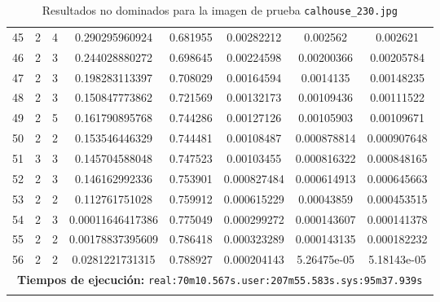 \begin{longtable}{|c|c|c|c|c|c|c|c|}
45 & 2 & 4 & 0.290295960924 & 0.681955 & 0.00282212 & 0.002562 & 0.002621 \\
46 & 2 & 3 & 0.244028880272 & 0.698645 & 0.00224598 & 0.00200366 & 0.00205784 \\
47 & 2 & 3 & 0.198283113397 & 0.708029 & 0.00164594 & 0.0014135 & 0.00148235 \\
48 & 2 & 3 & 0.150847773862 & 0.721569 & 0.00132173 & 0.00109436 & 0.00111522 \\
49 & 2 & 5 & 0.161790895768 & 0.744286 & 0.00127126 & 0.00105903 & 0.00109671 \\
50 & 2 & 2 & 0.153546446329 & 0.744481 & 0.00108487 & 0.000878814 & 0.000907648 \\
51 & 3 & 3 & 0.145704588048 & 0.747523 & 0.00103455 & 0.000816322 & 0.000848165 \\
52 & 2 & 3 & 0.146162992336 & 0.753901 & 0.000827484 & 0.000614913 & 0.000645663 \\
53 & 2 & 2 & 0.112761751028 & 0.759912 & 0.000615229 & 0.00043859 & 0.000453515 \\
54 & 2 & 3 & 0.00011646417386 & 0.775049 & 0.000299272 & 0.000143607 & 0.000141378 \\
55 & 2 & 2 & 0.00178837395609 & 0.786418 & 0.000323289 & 0.000143135 & 0.000182232 \\
56 & 2 & 2 & 0.0281221731315 & 0.788927 & 0.000204143 & 5.26475e-05 & 5.18143e-05 \\
\hline
\multicolumn{8}{|c|}{\textbf{Tiempos de ejecución:} \texttt{real:70m10.567s.user:207m55.583s.sys:95m37.939s}}\\  \hline
\caption{Resultados no dominados para la imagen de prueba \texttt{calhouse\_230.jpg}}
\label{tab:calhouse_230}
\end{longtable}
\normalsize

